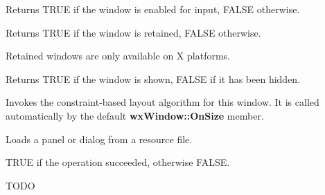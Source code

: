\label{wxwindowisenabled}


Returns TRUE if the window is enabled for input, FALSE otherwise.



\label{wxwindowisretained}


Returns TRUE if the window is retained, FALSE otherwise.


Retained windows are only available on X platforms.

\label{wxwindowisshown}


Returns TRUE if the window is shown, FALSE if it has been hidden.

\label{wxwindowlayout}


Invokes the constraint-based layout algorithm for this window. It is called
automatically by the default {\bf wxWindow::OnSize} member.

\label{wxwindowloadfromresource}


Loads a panel or dialog from a resource file.






TRUE if the operation succeeded, otherwise FALSE.


TODO


